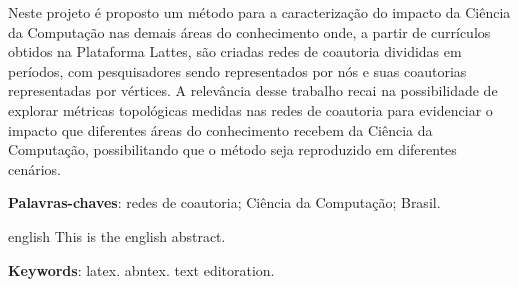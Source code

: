 
\setlength{\absparsep}{18pt} %
\begin{resumo}
    Neste projeto é proposto um método para a caracterização do impacto da Ciência da Computação nas demais áreas do conhecimento onde, a partir de currículos obtidos na Plataforma Lattes, são criadas redes de coautoria divididas em períodos, com pesquisadores sendo representados por nós e suas coautorias representadas por vértices. A relevância desse trabalho recai na possibilidade de explorar métricas topológicas medidas nas redes de coautoria para evidenciar o impacto que diferentes áreas do conhecimento recebem da Ciência da Computação, possibilitando que o método seja reproduzido em diferentes cenários.

 \textbf{Palavras-chaves}: redes de coautoria; Ciência da Computação; Brasil.
\end{resumo}

\begin{resumo}[Abstract]
 \begin{otherlanguage*}{english}
   This is the english abstract.

   \vspace{\onelineskip}
 
   \noindent 
   \textbf{Keywords}: latex. abntex. text editoration.
 \end{otherlanguage*}
\end{resumo}